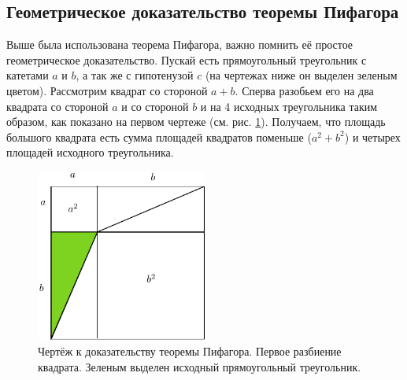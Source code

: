 \documentclass[12pt]{article}
\begin{document}
\subsection{Геометрическое доказательство теоремы Пифагора}
Выше была использована теорема Пифагора, важно помнить её простое геометрическое доказательство. Пускай есть прямоугольный треугольник с катетами $a$ и $b$, а так же с гипотенузой $c$ (на чертежах ниже он выделен зеленым цветом). Рассмотрим квадрат со стороной $a+b$. Сперва разобьем его на два квадрата со стороной $a$ и со стороной $b$ и на 4 исходных треугольника таким образом, как показано на первом чертеже (см. рис. \ref{fig:31}). Получаем, что площадь большого квадрата есть сумма площадей квадратов поменьше ($a^2+b^2$) и четырех площадей исходного треугольника.
\begin{figure}[ht]
	\centering
	\includegraphics[width=0.5\textwidth]{first21.pdf}
	\caption{Чертёж к доказательству теоремы Пифагора. Первое разбиение квадрата. Зеленым выделен исходный прямоугольный треугольник.}
	\label{fig:31}
\end{figure}
\end{document}
